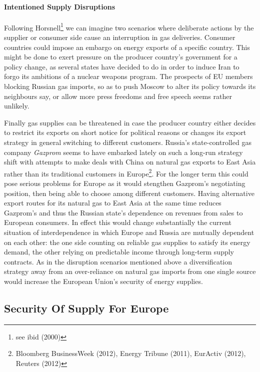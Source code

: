 \documentclass[11pt,a4paper,english]{scrreprt}
\begin{document}
	\paragraph{Intentioned Supply Disruptions}

Following Horsnell\footnote{see ibid (2000)} we can imagine two scenarios
where deliberate actions by the supplier or consumer side cause an
interruption in gas deliveries. Consumer countries could impose an embargo on
energy exports of a specific country. This might be done to exert pressure on
the producer country's government for a policy change, as several states have
decided to do in order to induce Iran to forgo its ambitions of a nuclear
weapons program. The prospects of EU members blocking Russian gas imports, so
as to push Moscow to alter its policy towards its neighbours say, or allow more
press freedoms and free speech seems rather unlikely.\par

Finally gas supplies can be threatened in case the producer country either
decides to restrict its exports on short notice for political reasons or changes
its export strategy in general switching to different customers. Russia's
state-controlled gas company \emph{Gazprom} seems to have embarked lately on
such a long-run strategy shift with attempts to make deals with China on natural
gas exports to East Asia rather than its traditional customers in
Europe\footnote{Bloomberg BusinessWeek (2012), Energy Tribune (2011), EurActiv
(2012), Reuters (2012)}. For the longer term this could pose serious problems
for Europe as it would stengthen Gazprom's negotiating position, then being able
to choose among different customers. Having alternative export routes for its
natural gas to East Asia at the same time reduces Gazprom's and thus the Russian
state's dependence on revenues from sales to European consumers. In effect this
would change substantially the current situation of interdependence in which
Europe and Russia are mutually dependent on each other: the one side counting on
reliable gas supplies to satisfy its energy demand, the other relying on
predictable income through long-term supply contracts. As in the disruption
scenarios mentioned above a diversification strategy away from an
over-reliance on natural gas imports from one single source would increase the
European Union's security of energy supplies.\par 




	\subsection{Security Of Supply For Europe}
\end{document}
